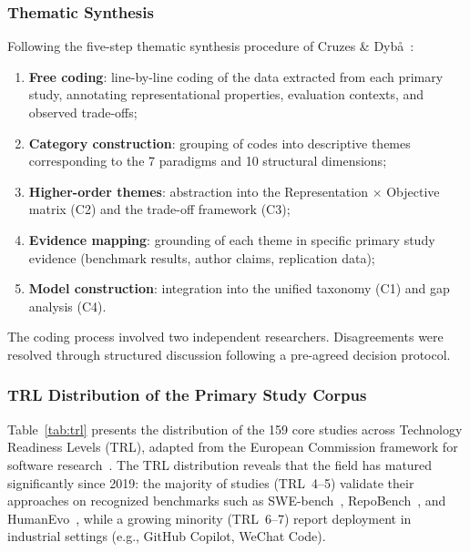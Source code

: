 \subsubsection{Thematic Synthesis}

Following the five-step thematic synthesis procedure of Cruzes \&
Dyb\r{a}~\cite{cruzes2011thematic}:

\begin{enumerate}
  \item \textbf{Free coding}: line-by-line coding of the data extracted from
  each primary study, annotating representational properties, evaluation
  contexts, and observed trade-offs;
  \item \textbf{Category construction}: grouping of codes into descriptive
  themes corresponding to the 7 paradigms and 10 structural dimensions;
  \item \textbf{Higher-order themes}: abstraction into the Representation
  $\times$ Objective matrix (C2) and the trade-off framework (C3);
  \item \textbf{Evidence mapping}: grounding of each theme in specific primary
  study evidence (benchmark results, author claims, replication data);
  \item \textbf{Model construction}: integration into the unified taxonomy (C1)
  and gap analysis (C4).
\end{enumerate}

The coding process involved two independent researchers. Disagreements were
resolved through structured discussion following a pre-agreed decision protocol.

\subsubsection{TRL Distribution of the Primary Study Corpus}

Table~\ref{tab:trl} presents the distribution of the 159 core studies across
Technology Readiness Levels (TRL), adapted from the European Commission
framework for software research~\cite{acm_empirical_standards}. The TRL
distribution reveals that the field has matured significantly since 2019:
the majority of studies (TRL~4--5) validate their approaches on recognized
benchmarks such as SWE-bench~\cite{jimenez2024swebench},
RepoBench~\cite{liu2024repobench}, and HumanEvo~\cite{zheng2025humanevo},
while a growing minority (TRL~6--7) report deployment in industrial settings
(e.g., GitHub Copilot, WeChat Code).

